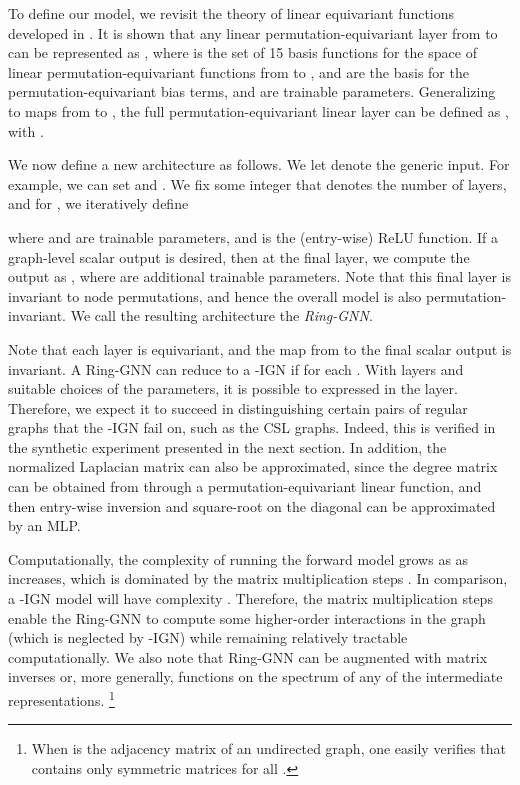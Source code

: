 \documentclass{article}
\begin{document}
To define our model, we revisit the theory of linear equivariant functions developed in \cite{maron2018invariant}.
It is shown that any linear permutation-equivariant layer from  to  can be represented as , where  is the set of 15 basis functions
for the space of linear permutation-equivariant functions from  to ,  and  are the basis for the permutation-equivariant bias terms, and  are trainable parameters. Generalizing to maps from  to , the full permutation-equivariant linear layer can be defined as , with .

We now define a new architecture as follows. We let  denote the generic input. For example, we can set  and . We fix some integer  that denotes the number of layers, and for , we iteratively define

where  and  are trainable parameters, and  is the (entry-wise) ReLU function. 
If a graph-level scalar output is desired, then at the final layer, we compute the output as , where  are additional trainable parameters. Note that this final layer is invariant to node permutations, and hence the overall model is also permutation-invariant. We call the resulting architecture the \textit{Ring-GNN}.

Note that each layer is equivariant, and the map from  to the final scalar output is invariant. A Ring-GNN can reduce to a -IGN if  for each . With  layers and suitable choices of the parameters, it is possible to expressed  in the  layer. Therefore, we expect it to succeed in distinguishing certain pairs of regular graphs that the -IGN fail on, such as the CSL graphs. Indeed, this is verified in the synthetic experiment presented in the next section. In addition, the normalized Laplacian matrix  can also be approximated, since the degree matrix  can be obtained from  through a permutation-equivariant linear function, and then entry-wise inversion and square-root on the diagonal can be approximated by an MLP.

Computationally, the complexity of running the forward model grows as  as  increases, which is dominated by the matrix multiplication steps \cite{coppersmith1987arithmetic}.
In comparison, a -IGN model will have complexity . Therefore, the matrix multiplication steps enable the Ring-GNN to compute some higher-order interactions in the graph (which is neglected by -IGN) while remaining relatively tractable computationally.
We also note that Ring-GNN can be augmented with matrix inverses or, more generally, functions on the spectrum of any of the intermediate representations. \footnote{When  is the adjacency matrix of an undirected graph, one easily verifies that  contains only symmetric matrices for all .} 
\end{document}
